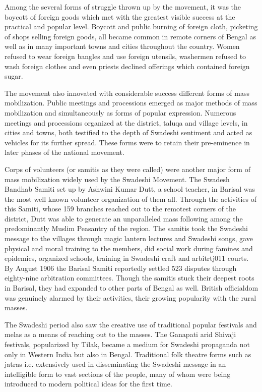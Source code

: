 Among the several forms of struggle thrown up by the movement, it was the boycott of foreign goods which met with the greatest visible success at the practical and popular level. Boycott and public burning of foreign cloth, picketing of shops selling foreign goods, all became common in remote corners of Bengal as well as in many important towns and cities throughout the country. Women refused to wear foreign bangles and use foreign utensils, washermen refused to wash foreign clothes and even priests declined offerings which contained foreign sugar.

The movement also innovated with considerable success different forms of mass mobilization. Public meetings and processions emerged as major methods of mass mobilization and simultaneously as forms of popular expression. Numerous meetings and processions organized at the district, taluqa and village levels, in cities and towns, both testified to the depth of Swadeshi sentiment and acted as vehicles for its further spread. These forms were to retain their pre-eminence in later phases of the national movement.

Corps of volunteers (or samitis as they were called) were another major form of mass mobilization widely used by the Swadeshi Movement. The Swadesh Bandhab Samiti set up by Ashwini Kumar Dutt, a school teacher, in Barisal was the most well known volunteer organization of them all. Through the activities of this Samiti, whose 159 branches reached out to the remotest corners of the district, Dutt was able to generate an unparalleled mass following among the predominantly Muslim Peasantry of the region. The samitis took the Swadeshi message to the villages through magic lantern lectures and Swadeshi songs, gave physical and moral training to the members, did social work during famines and epidemics, organized schools, training in Swadeshi craft and arbitrtj011 courts. By August 1906 the Barisal Samiti reportedly settled 523 disputes through eighty-nine arbitration committees. Though the samitis stuck their deepest roots in Barisal, they had expanded to other parts of Bengal as well. British officialdom was genuinely alarmed by their activities, their growing popularity with the rural masses.

The Swadeshi period also saw the creative use of traditional popular festivals and melas as a means of reaching out to the masses. The Ganapati arid Shivaji festivals, popularized by Tilak, became a medium for Swadeshi propaganda not only in Western India but also in Bengal. Traditional folk theatre forms such as jatras i.e. extensively used in disseminating the Swadeshi message in an intelligible form to vast sections of the people, many of whom were being introduced to modern political ideas for the first time.

